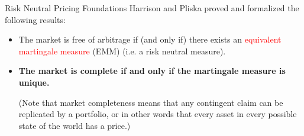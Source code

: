 \documentclass{beamer}
\begin{document}
\begin{frame}{Risk Neutral Pricing Foundations}
	Harrison and Pliska proved and formalized the following results:
	\begin{itemize}
		\item The market is free of arbitrage if (and only if) there exists an \textcolor{red}{equivalent martingale measure} (EMM) (i.e. a risk neutral measure).
		\item \textbf{The market is complete if and only if the martingale measure is unique.}
		
		(Note that market completeness means that any contingent claim can be replicated by a portfolio, or in other words that every asset in every possible state of the world has a price.)
	\end{itemize}
	\vfill
\end{frame}


\end{document}
